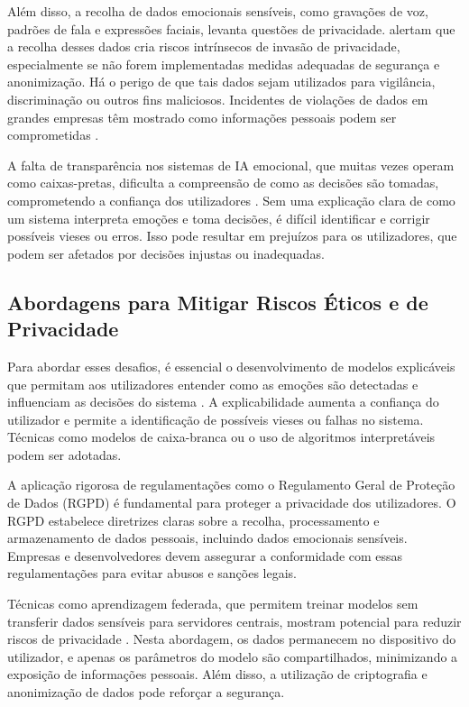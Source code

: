 \documentclass[a4paper,12pt]{report}
\begin{document}
	Além disso, a recolha de dados emocionais sensíveis, como gravações de voz, padrões de fala e expressões faciais, levanta questões de privacidade. \textcite{loewenstein2001} alertam que a recolha desses dados cria riscos intrínsecos de invasão de privacidade, especialmente se não forem implementadas medidas adequadas de segurança e anonimização. Há o perigo de que tais dados sejam utilizados para vigilância, discriminação ou outros fins maliciosos. Incidentes de violações de dados em grandes empresas têm mostrado como informações pessoais podem ser comprometidas \parencite{solove2013}.
	
	A falta de transparência nos sistemas de IA emocional, que muitas vezes operam como caixas-pretas, dificulta a compreensão de como as decisões são tomadas, comprometendo a confiança dos utilizadores \parencite{russell2020}. Sem uma explicação clara de como um sistema interpreta emoções e toma decisões, é difícil identificar e corrigir possíveis vieses ou erros. Isso pode resultar em prejuízos para os utilizadores, que podem ser afetados por decisões injustas ou inadequadas.
	
	\subsection{Abordagens para Mitigar Riscos Éticos e de Privacidade}
	
	Para abordar esses desafios, é essencial o desenvolvimento de modelos explicáveis que permitam aos utilizadores entender como as emoções são detectadas e influenciam as decisões do sistema \parencite{russell2020}. A explicabilidade aumenta a confiança do utilizador e permite a identificação de possíveis vieses ou falhas no sistema. Técnicas como modelos de caixa-branca ou o uso de algoritmos interpretáveis podem ser adotadas.
	
	A aplicação rigorosa de regulamentações como o Regulamento Geral de Proteção de Dados (RGPD) é fundamental para proteger a privacidade dos utilizadores. O RGPD estabelece diretrizes claras sobre a recolha, processamento e armazenamento de dados pessoais, incluindo dados emocionais sensíveis. Empresas e desenvolvedores devem assegurar a conformidade com essas regulamentações para evitar abusos e sanções legais.
	
	Técnicas como aprendizagem federada, que permitem treinar modelos sem transferir dados sensíveis para servidores centrais, mostram potencial para reduzir riscos de privacidade \parencite{pessoa2008}. Nesta abordagem, os dados permanecem no dispositivo do utilizador, e apenas os parâmetros do modelo são compartilhados, minimizando a exposição de informações pessoais. Além disso, a utilização de criptografia e anonimização de dados pode reforçar a segurança.
	
\end{document}

